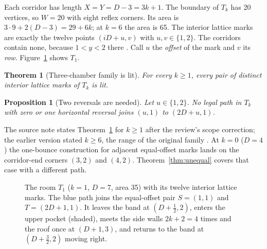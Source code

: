\documentclass[11pt]{article}
\newtheorem{theorem}{Theorem}
\newtheorem{proposition}{Proposition}
\theoremstyle{definition}
\theoremstyle{remark}
\begin{document}
Each corridor has length $X=Y=D-3=3k+1$. The boundary of $T_k$ has 20
vertices, so $W=20$ with eight reflex corners. Its area is
$3\cdot 9+2(D-3)=29+6k$; at $k=6$ the area is 65. The interior lattice marks
are exactly the twelve points $(iD+u,v)$ with $u,v\in\{1,2\}$. The corridors
contain none, because $1<y<2$ there \cite{d200}. Call $u$ the \emph{offset} of
the mark and $v$ its \emph{row}. Figure~\ref{fig:room} shows $T_1$.

\begin{theorem}[Three-chamber family is lit]\label{thm:three}
For every $k\ge 1$, every pair of distinct interior lattice marks of $T_k$ is
lit.
\end{theorem}

\begin{proposition}[Two reversals are needed]\label{prop:reversal}
Let $u\in\{1,2\}$. No legal path in $T_k$ with zero or one horizontal reversal
joins $(u,1)$ to $(2D+u,1)$.
\end{proposition}

The source note states Theorem~\ref{thm:three} for $k\ge 1$ after the review's
scope correction; the earlier version stated $k\ge 6$, the range of the
original family \cite{R1,d200}. At $k=0$ ($D=4$) the one-bounce construction
for adjacent equal-offset marks lands on the corridor-end corners $(3,2)$ and
$(4,2)$. Theorem~\ref{thm:unequal} covers that case with a different path.

\begin{figure}[t]
\centering
{}
\caption{The room $T_1$ ($k=1$, $D=7$, area 35) with its twelve interior
lattice marks. The blue path joins the equal-offset pair $S=(1,1)$ and
$T=(2D+1,1)$. It leaves the band at $(D+\tfrac12,2)$, enters the upper pocket
(shaded), meets the side walls $2k+2=4$ times and the roof once at
$(D+1,3)$, and returns to the band at $(D+\tfrac32,2)$ moving right.}
\label{fig:room}
\end{figure}
\end{document}
